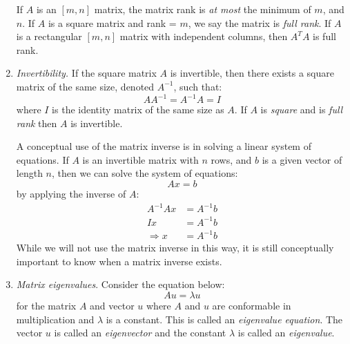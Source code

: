 \begin{enumerate}
\vspace{0.1cm}

\noindent If $A$ is an $[m,n]$ matrix, the matrix rank is \emph{at most} the minimum of $m$, and $n$.  If $A$ is a square matrix and rank = $m$, we say the matrix is \emph{full rank}.  If $A$ is a rectangular $[m,n]$ matrix with independent columns, then $A^{T}A$ is full rank.


\item \emph{Invertibility.} If the square matrix $A$ is invertible, then there exists a square matrix of the same size, denoted $A^{-1}$, such that:
\begin{equation*}
A A^{-1} = A^{-1}A = I
\end{equation*}
where $I$ is the identity matrix of the same size as $A$.  If $A$ is \emph{square} and is \emph{full rank} then $A$ is invertible.  

A conceptual use of the matrix inverse is in solving a linear system of equations. If $A$ is an invertible matrix with $n$ rows, and $b$ is a given vector of length $n$, then we can solve the system of equations:
\begin{equation*}
Ax = b
\end{equation*}
by applying the inverse of $A$:
\begin{align*}
A^{-1}Ax &= A^{-1}b \\
Ix &= A^{-1}b \\
\Rightarrow x &= A^{-1}b
\end{align*}
While we will not use the matrix inverse in this way, it is still conceptually important to know when a matrix inverse exists.

\item \emph{Matrix eigenvalues}.  Consider the equation below:
\begin{equation*}
Au = \lambda u
\end{equation*}
for the matrix $A$ and vector $u$ where $A$ and $u$ are conformable in multiplication and $\lambda$ is a constant.  This is called an \emph{eigenvalue equation}.  The vector $u$ is called an \emph{eigenvector} and the constant $\lambda$ is called an \emph{eigenvalue}.  


\end{enumerate}
